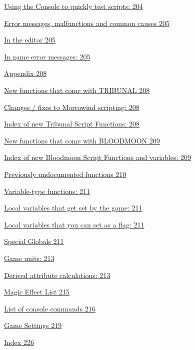 \documentclass[
]{article}
\begin{document}
\protect\hyperlink{using-the-console-to-quickly-test-scripts}{Using the
Console to quickly test scripts: 204}

\protect\hyperlink{error-messages-malfunctions-and-common-causes}{Error
messages, malfunctions and common causes 205}

\protect\hyperlink{in-the-editor}{In the editor 205}

\protect\hyperlink{in-game-error-messages}{In game error messages: 205}

\protect\hyperlink{appendix}{Appendix 208}

\protect\hyperlink{new-functions-that-come-with-tribunal}{New functions
that come with TRIBUNAL 208}

\protect\hyperlink{changes-fixes-to-morrowind-scripting}{Changes / fixes
to Morrowind scripting: 208}

\protect\hyperlink{index-of-new-tribunal-script-functions}{Index of new
Tribunal Script Functions: 208}

\protect\hyperlink{new-functions-that-come-with-bloodmoon}{New functions
that come with BLOODMOON 209}

\protect\hyperlink{index-of-new-bloodmoon-script-functions-and-variables}{Index
of new Bloodmoon Script Functions and variables: 209}

\protect\hyperlink{previously-undocumented-functions}{Previously
undocumented functions 210}

\protect\hyperlink{variable-type-functions}{Variable-type functions:
211}

\protect\hyperlink{local-variables-that-get-set-by-the-game}{Local
variables that get set by the game: 211}

\protect\hyperlink{local-variables-that-you-can-set-as-a-flag}{Local
variables that you can set as a flag: 211}

\protect\hyperlink{special-globals}{Special Globals 211}

\protect\hyperlink{game-units}{Game units: 213}

\protect\hyperlink{derived-attribute-calculations}{Derived attribute
calculations: 213}

\protect\hyperlink{_Toc53412751}{Magic Effect List 215}

\protect\hyperlink{list-of-console-commands}{List of console commands
216}

\protect\hyperlink{game-settings}{Game Settings 219}

\protect\hyperlink{index}{Index 226}
\end{document}
